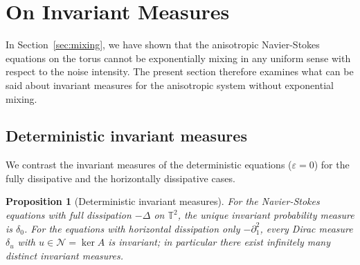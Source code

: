 \documentclass[11pt,a4paper,reqno]{amsart}
\newtheorem{proposition}[theorem]{Proposition}
\theoremstyle{definition}
\begin{document}
\section{On Invariant Measures}\label{sec:invmeas}
 In Section~\ref{sec:mixing},
 we have shown that the anisotropic
Navier-Stokes equations on the torus cannot be exponentially mixing in any
uniform sense with respect to the noise intensity.
The present section therefore examines what can be said about invariant measures
for the anisotropic system without exponential mixing.

\subsection{Deterministic invariant measures}

We contrast the invariant measures of the deterministic equations
(\(\varepsilon=0\)) for the fully dissipative and the horizontally dissipative
cases.

\begin{proposition}[Deterministic invariant measures]\label{prop:det_inv}
 For the Navier-Stokes equations with \emph{full dissipation}
    \(-\Delta\) on \(\mathbb{T}^{2}\), the unique invariant probability measure
    is \(\delta_{0}\).
 For the equations with \emph{horizontal dissipation only}
    \(-\partial_{1}^{2}\), every Dirac measure \(\delta_{u}\) with
    \(u\in\mathcal{N}=\ker A\) is invariant; in particular there exist
    infinitely many distinct invariant measures.
\end{proposition}
\end{document}
